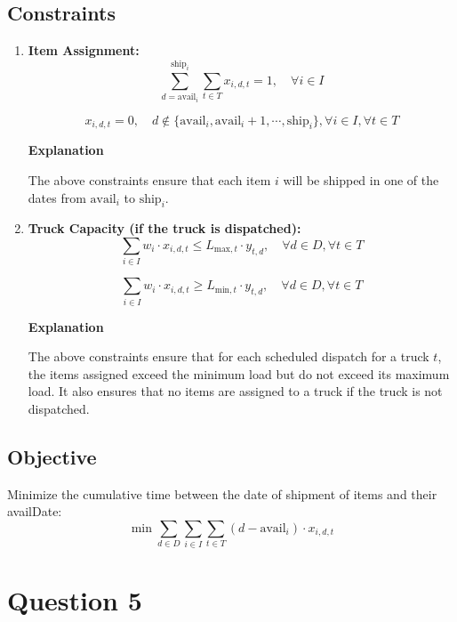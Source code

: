 \documentclass[11pt]{article}
\begin{document}
\subsection*{Constraints}
\begin{enumerate}
    \item \textbf{Item Assignment:}
    \[
        \sum_{d=\text{avail}_i}^{\text{ship}_i}\sum_{t \in T} x_{i,d,t} = 1, \quad \forall i \in I
    \]

    \[
        x_{i,d,t} = 0, \quad d \notin \{\text{avail}_i,\text{avail}_i + 1, \cdots, \text{ship}_i\},\forall i \in I, \forall t \in T
    \]

    \noindent\textbf{Explanation}  

    The above constraints ensure that each item \(i\) will be shipped in one of the dates from \(\text{avail}_i\) to \(\text{ship}_i\).
    
    \item \textbf{Truck Capacity (if the truck is dispatched):}
    \[
        \sum_{i \in I} w_i\cdot x_{i,d,t} \leq L_{\text{max},t} \cdot y_{t,d}, \quad \forall d \in D, \forall t \in T
    \]

    \[
        \sum_{i \in I} w_i\cdot x_{i,d,t} \geq L_{\text{min},t} \cdot y_{t,d}, \quad \forall d \in D, \forall t \in T
    \]

    \noindent\textbf{Explanation}
    
    The above constraints ensure that for each scheduled dispatch for a truck \(t\), the items assigned exceed the minimum load but do not exceed its maximum load. It also ensures that no items are assigned to a truck if the truck is not dispatched.

\end{enumerate}

\subsection*{Objective}
Minimize the cumulative time between the date of shipment of items and their availDate:
\[
    \min \sum_{d \in D} \sum_{i \in I} \sum_{t \in T} (d - \text{avail}_i) \cdot x_{i,d,t}
\]


\section*{Question 5}
\end{document}
